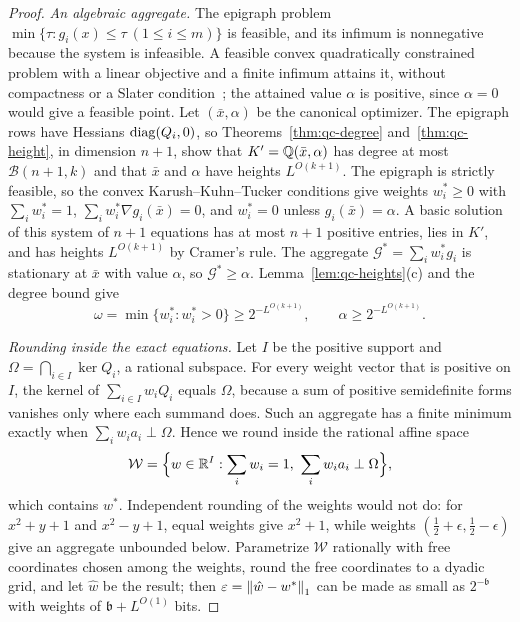 \begin{proof}
\emph{An algebraic aggregate.} The epigraph problem
$\min\{\tau:g_i(x)\le\tau\ (1\le i\le m)\}$ is feasible, and its infimum is
nonnegative because the system is infeasible. A feasible convex
quadratically constrained problem with a linear objective and a finite
infimum attains it, without compactness or a Slater
condition~\cite[Corollary~2, in the numbering of the 1997
report]{LuoZhang1999}; the attained value $\alpha$ is positive, since
$\alpha=0$ would give a feasible point. Let $(\bar x,\alpha)$ be the canonical
optimizer. The epigraph rows have Hessians $\operatorname{diag}(Q_i,0)$, so
Theorems~\ref{thm:qc-degree} and~\ref{thm:qc-height}, in dimension $n+1$, show
that $K'=\mathbb Q(\bar x,\alpha)$ has degree at most $\mathcal B(n+1,k)$ and that
$\bar x$ and $\alpha$ have heights $L^{O(k+1)}$. The epigraph is strictly
feasible, so the convex Karush--Kuhn--Tucker conditions give weights
$w_i^*\ge0$ with $\sum_iw_i^*=1$, $\sum_iw_i^*\nabla g_i(\bar x)=0$, and
$w_i^*=0$ unless $g_i(\bar x)=\alpha$. A basic solution of this system of
$n+1$ equations has at most $n+1$ positive entries, lies in $K'$, and has
heights $L^{O(k+1)}$ by Cramer's rule. The aggregate
$\mathcal G^*=\sum_iw_i^*g_i$ is stationary at $\bar x$ with value $\alpha$, so
$\mathcal G^*\ge\alpha$. Lemma~\ref{lem:qc-heights}(c) and the degree bound
give
\[
\omega=\min\{w_i^*:w_i^*>0\}\ge2^{-L^{O(k+1)}},\qquad\alpha\ge2^{-L^{O(k+1)}} .
\]

\emph{Rounding inside the exact equations.} Let $I$ be the positive support
and $\Omega=\bigcap_{i\in I}\ker Q_i$, a rational subspace. For every weight
vector that is positive on $I$, the kernel of $\sum_{i\in I}w_iQ_i$ equals
$\Omega$, because a sum of positive semidefinite forms vanishes only where
each summand does. Such an aggregate has a finite minimum exactly when
$\sum_iw_ia_i\perp\Omega$. Hence we round inside the rational affine space
\[
\mathcal W=\Bigl\{w\in\R^I:\sum_iw_i=1,\ \sum_iw_ia_i\perp\Omega\Bigr\},
\]
which contains $w^*$. Independent rounding of the weights would not do: for
$x^2+y+1$ and $x^2-y+1$, equal weights give $x^2+1$, while weights
$(\tfrac12+\epsilon,\tfrac12-\epsilon)$ give an aggregate unbounded below.
Parametrize $\mathcal W$ rationally with free coordinates chosen among the
weights, round the free coordinates to a dyadic grid, and let $\hat w$ be the
result; then $\varepsilon=\left\lVert\hat w-w^*\right\rVert_1$ can be made as small as
$2^{-\mathfrak b}$ with weights of $\mathfrak b+L^{O(1)}$ bits.


\end{proof}
